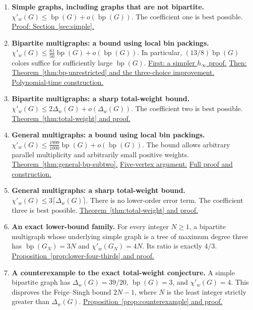 \documentclass[11pt]{article}
\theoremstyle{definition}\newtheorem{algorithm}{Algorithm}[section]
\numberwithin{equation}{section}
\theoremstyle{remark}\newtheorem*{remark}{Remark}
\newcommand{\bp}{\operatorname{bp}}
\begin{document}
\begin{enumerate}[leftmargin=*,itemsep=3pt,topsep=3pt]
\item \textbf{Simple graphs, including graphs that are not bipartite.}
$\chi'_w(G)\le\bp(G)+o(\bp(G))$.
The coefficient one is best possible.
\hyperref[sec:simple]{Proof: Section~\ref*{sec:simple}.}

\item \textbf{Bipartite multigraphs: a bound using local bin packings.}
$\chi'_w(G)\le \frac{81}{50}\bp(G)+o(\bp(G))$.
In particular, $(13/8)\bp(G)$ colors suffice for sufficiently large
$\bp(G)$.
\hyperref[thm:bp-harmonic-first]{First: a simpler $h_\infty$ proof.}
\hyperref[thm:bp-unrestricted]{Then: Theorem~\ref*{thm:bp-unrestricted} and the three-choice improvement.}
\hyperref[alg:bp]{Polynomial-time construction.}

\item \textbf{Bipartite multigraphs: a sharp total-weight bound.}
$\chi'_w(G)\le2\Delta_w(G)+o(\Delta_w(G))$.
The coefficient two is best possible.
\hyperref[thm:total-weight]{Theorem~\ref*{thm:total-weight} and proof.}

\item \textbf{General multigraphs: a bound using local bin packings.}
$\chi'_w(G)\le\frac{1999}{1000}\bp(G)+o(\bp(G))$.
The bound allows arbitrary parallel multiplicity and arbitrarily small
positive weights.
\hyperref[thm:general-bp-subtwo]{Theorem~\ref*{thm:general-bp-subtwo}.}
\hyperref[sec:subtwo-local]{Five-vertex argument.}
\hyperref[sec:general-subtwo]{Full proof and construction.}

\item \textbf{General multigraphs: a sharp total-weight bound.}
$\chi'_w(G)\le3\lceil\Delta_w(G)\rceil$.
There is no lower-order error term.
The coefficient three is best possible.
\hyperref[thm:total-weight]{Theorem~\ref*{thm:total-weight} and proof.}

\item \textbf{An exact lower-bound family.}
For every integer $N\ge1$, a bipartite multigraph whose underlying
simple graph is a tree of maximum degree three has $\bp(G_N)=3N$ and
$\chi'_w(G_N)=4N$. Its ratio is exactly $4/3$.
\hyperref[prop:lower-four-thirds]{Proposition~\ref*{prop:lower-four-thirds} and proof.}

\item \textbf{A counterexample to the exact total-weight conjecture.}
A simple bipartite graph has $\Delta_w(G)=39/20$, $\bp(G)=3$, and
$\chi'_w(G)=4$. This disproves the Feige--Singh bound $2N-1$,
where $N$ is the least integer strictly greater than $\Delta_w(G)$.
\hyperref[prop:counterexample]{Proposition~\ref*{prop:counterexample} and proof.}
\end{enumerate}
\end{document}
